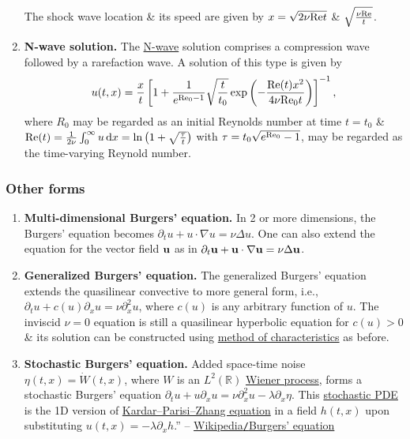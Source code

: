 \documentclass{article}
\begin{document}
\begin{enumerate}
	The shock wave location \& its speed are given by $x = \sqrt{2\nu{\rm Re}t}$ \& $\sqrt{\frac{\nu{\rm Re}}{t}}$.
	\item {\bf N-wave solution.} The \href{https://en.wikipedia.org/wiki/N-wave}{N-wave} solution comprises a compression wave followed by a rarefaction wave. A solution of this type is given by
	\begin{equation*}
		u(t,x) = \frac{x}{t}\left[1 + \frac{1}{e^{{\rm Re}_0 - 1}}\sqrt{\frac{t}{t_0}}\exp\left(-\frac{{\rm Re}(t)x^2}{4\nu{\rm Re}_0t}\right)\right]^{-1},
	\end{equation*}
	where $R_0$ may be regarded as an initial Reynolds number at time $t = t_0$ \& ${\rm Re}(t) = \frac{1}{2\nu}\int_0^\infty u\,{\rm d}x = \ln\left(1 + \sqrt{\frac{\tau}{t}}\right)$ with $\tau = t_0\sqrt{e^{{\rm Re}_0} - 1}$, may be regarded as the time-varying Reynold number.
\end{enumerate}

\subsubsection{Other forms}

\begin{enumerate}
	\item {\bf Multi-dimensional Burgers' equation.} In 2 or more dimensions, the Burgers' equation becomes $\partial_tu + u\cdot\nabla u = \nu\Delta u$. One can also extend the equation for the vector field ${\bf u}$ as in $\partial_t{\bf u} + {\bf u}\cdot\nabla{\bf u} = \nu\Delta{\bf u}$.
	\item {\bf Generalized Burgers' equation.} The generalized Burgers' equation extends the quasilinear convective to more general form, i.e., $\partial_tu + c(u)\partial_xu = \nu\partial_x^2u$, where $c(u)$ is any arbitrary function of $u$. The inviscid $\nu = 0$ equation is still a quasilinear hyperbolic equation for $c(u) > 0$ \& its solution can be constructed using \href{https://en.wikipedia.org/wiki/Method_of_characteristics}{method of characteristics} as before.
	\item {\bf Stochastic Burgers' equation.} Added space-time noise $\eta(t,x) = \dot{W}(t,x)$, where $W$ is an $L^2(\mathbb{R})$ \href{https://en.wikipedia.org/wiki/Wiener_process}{Wiener process}, forms a stochastic Burgers' equation $\partial_tu + u\partial_xu = \nu\partial_x^2u - \lambda\partial_x\eta$. This \href{https://en.wikipedia.org/wiki/Stochastic_PDE}{stochastic PDE} is the 1D version of \href{https://en.wikipedia.org/wiki/Kardar%E2%80%93Parisi%E2%80%93Zhang_equation}{Kardar--Parisi--Zhang equation} in a field $h(t,x)$ upon substituting $u(t,x) = -\lambda\partial_xh$.'' -- \href{https://en.wikipedia.org/wiki/Burgers%27_equation}{Wikipedia{\tt/}Burgers' equation}
\end{enumerate}
\end{document}

